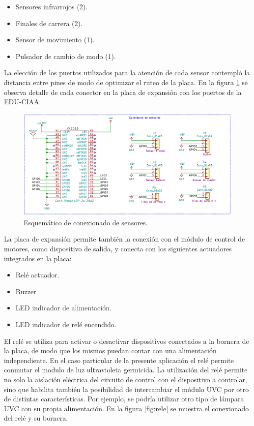 \begin{itemize}
	\item Sensores infrarrojos (2).
	\item Finales de carrera (2).
	\item Sensor de movimiento (1).
	\item Pulsador de cambio de modo (1).
	
\end{itemize}

La elección de los puertos utilizados para la atención de cada sensor contempló la distancia entre pines de modo de optimizar el ruteo de la placa. En la figura \ref{fig:consesnores} se observa detalle de cada  conector en la placa de expansión con los puertos de la EDU-CIAA.


\begin{figure}[h]
	\centering
	\includegraphics[width=13cm]{./Figures/sensores2.PNG}
	\caption{Esquemático de conexionado de sensores.}
	\label{fig:consesnores}
\end{figure}

La placa de expansión permite también la conexión con el módulo de control de motores, como dispositivo de salida, y conecta con los siguientes actuadores integrados en la placa:

\begin{itemize}
	\item Relé actuador.
	\item Buzzer
	\item LED indicador de alimentación.
	\item LED indicador de relé encendido.
\end{itemize}


El relé se utiliza para activar o desactivar dispositivos conectados a la bornera de la placa, de modo que los mismos puedan contar con una alimentación independiente. En el caso particular de la presente aplicación el relé permite conmutar el modulo de luz ultravioleta germicida. 
La utilización del relé permite no solo la aislación eléctrica del circuito de control con el dispositivo a controlar, sino que habilita también la posibilidad de intercambiar el módulo UVC por otro de distintas características. Por ejemplo, se podría utilizar otro tipo de lámpara UVC con su propia alimentación.  
En la figura \ref{fig:rele} se muestra el conexionado del relé y su bornera.

